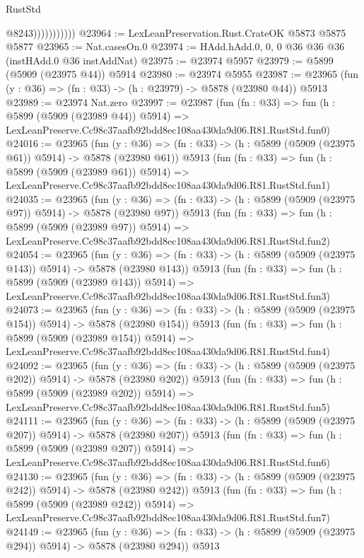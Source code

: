 \begin{lexlean}{RustStd}
\begin{coremodule}
{{                          @8243)))))))))))
@23964 := LexLeanPreservation.Rust.CrateOK @5873 @5875 @5877
@23965 := Nat.casesOn.{0}
@23974 := HAdd.hAdd.{0, 0, 0} @36 @36 @36 (instHAdd.{0} @36 instAddNat)
@23975 := @23974 @5957
@23979 := @5899 (@5909 (@23975 @44)) @5914
@23980 := @23974 @5955
@23987 := @23965 (fun (y : @36) => (fn : @33) -> (h : @23979) -> @5878 (@23980 @44)) @5913
@23989 := @23974 Nat.zero
@23997 := @23987
    (fun (fn : @33) =>
    fun (h : @5899 (@5909 (@23989 @44)) @5914) =>
    LexLeanPreserve.Cc98c37aafb92bdd8ec108aa430da9d06.R81.RustStd.fun0)
@24016 := @23965
    (fun (y : @36) => (fn : @33) -> (h : @5899 (@5909 (@23975 @61)) @5914) -> @5878 (@23980 @61))
    @5913
    (fun (fn : @33) =>
    fun (h : @5899 (@5909 (@23989 @61)) @5914) =>
    LexLeanPreserve.Cc98c37aafb92bdd8ec108aa430da9d06.R81.RustStd.fun1)
@24035 := @23965
    (fun (y : @36) => (fn : @33) -> (h : @5899 (@5909 (@23975 @97)) @5914) -> @5878 (@23980 @97))
    @5913
    (fun (fn : @33) =>
    fun (h : @5899 (@5909 (@23989 @97)) @5914) =>
    LexLeanPreserve.Cc98c37aafb92bdd8ec108aa430da9d06.R81.RustStd.fun2)
@24054 := @23965
    (fun (y : @36) => (fn : @33) -> (h : @5899 (@5909 (@23975 @143)) @5914) -> @5878 (@23980 @143))
    @5913
    (fun (fn : @33) =>
    fun (h : @5899 (@5909 (@23989 @143)) @5914) =>
    LexLeanPreserve.Cc98c37aafb92bdd8ec108aa430da9d06.R81.RustStd.fun3)
@24073 := @23965
    (fun (y : @36) => (fn : @33) -> (h : @5899 (@5909 (@23975 @154)) @5914) -> @5878 (@23980 @154))
    @5913
    (fun (fn : @33) =>
    fun (h : @5899 (@5909 (@23989 @154)) @5914) =>
    LexLeanPreserve.Cc98c37aafb92bdd8ec108aa430da9d06.R81.RustStd.fun4)
@24092 := @23965
    (fun (y : @36) => (fn : @33) -> (h : @5899 (@5909 (@23975 @202)) @5914) -> @5878 (@23980 @202))
    @5913
    (fun (fn : @33) =>
    fun (h : @5899 (@5909 (@23989 @202)) @5914) =>
    LexLeanPreserve.Cc98c37aafb92bdd8ec108aa430da9d06.R81.RustStd.fun5)
@24111 := @23965
    (fun (y : @36) => (fn : @33) -> (h : @5899 (@5909 (@23975 @207)) @5914) -> @5878 (@23980 @207))
    @5913
    (fun (fn : @33) =>
    fun (h : @5899 (@5909 (@23989 @207)) @5914) =>
    LexLeanPreserve.Cc98c37aafb92bdd8ec108aa430da9d06.R81.RustStd.fun6)
@24130 := @23965
    (fun (y : @36) => (fn : @33) -> (h : @5899 (@5909 (@23975 @242)) @5914) -> @5878 (@23980 @242))
    @5913
    (fun (fn : @33) =>
    fun (h : @5899 (@5909 (@23989 @242)) @5914) =>
    LexLeanPreserve.Cc98c37aafb92bdd8ec108aa430da9d06.R81.RustStd.fun7)
@24149 := @23965
    (fun (y : @36) => (fn : @33) -> (h : @5899 (@5909 (@23975 @294)) @5914) -> @5878 (@23980 @294))
    @5913
}}
\end{coremodule}
\end{lexlean}
